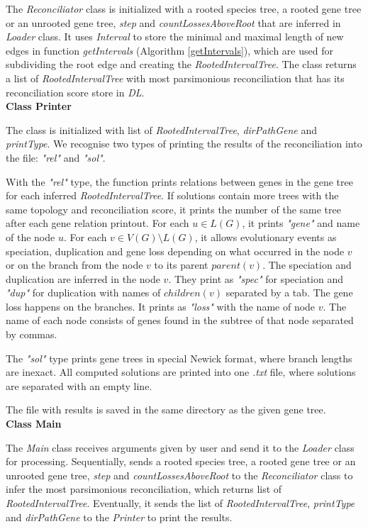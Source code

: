 The \emph{Reconciliator} class is initialized with a rooted species tree, a rooted gene tree or an unrooted gene tree, \emph{step} and \emph{countLossesAboveRoot} that are inferred in \emph{Loader} class. It uses \emph{Interval} to store the minimal and maximal length of new edges in function \emph{getIntervals} (Algorithm \ref{getIntervals}), which are used for subdividing the root edge and creating the \emph{RootedIntervalTree}. The class returns a list of \emph{RootedIntervalTree} with most parsimonious reconciliation that has its reconciliation score store in \emph{DL}.\\
\textbf{Class Printer}

The class is initialized with list of \emph{RootedIntervalTree}, \emph{dirPathGene} and \emph{printType}. We recognise two types of printing the results of the reconciliation into the file: \emph{"rel"} and \emph{"sol"}.

With the \emph{"rel"} type, the function prints relations between genes in the gene tree for each inferred \emph{RootedIntervalTree}. If solutions contain more trees with the same topology and reconciliation score, it prints the number of the same tree after each gene relation printout. For each $u \in L(G)$, it prints \emph{"gene"} and name of the node $u$. For each $v \in V(G)\setminus L(G)$, it allows evolutionary events as speciation, duplication and gene loss depending on what occurred in the node $v$ or on the branch from the node $v$ to its parent $parent(v)$. The speciation and duplication are inferred in the node $v$. They print as \emph{"spec"} for speciation and \emph{"dup"} for duplication with names of $children(v)$ separated by a tab. The gene loss happens on the branches. It prints as \emph{"loss"} with the name of node $v$. The name of each node consists of genes found in the subtree of that node separated by commas. 

The \emph{"sol"} type prints gene trees in special Newick format, where branch lengths are inexact. All computed solutions are printed into one \emph{.txt} file, where solutions are separated with an empty line.

The file with results is saved in the same directory as the given gene tree.\\
\textbf{Class Main}

The \emph{Main} class receives arguments given by user and send it to the \emph{Loader} class for processing. Sequentially, sends a rooted species tree, a rooted gene tree or an unrooted gene tree, \emph{step} and \emph{countLossesAboveRoot} to the \emph{Reconciliator} class to infer the most parsimonious reconciliation, which returns list of \emph{RootedIntervalTree}. Eventually, it sends the list of \emph{RootedIntervalTree}, \emph{printType} and \emph{dirPathGene} to the \emph{Printer} to print the results. \\
